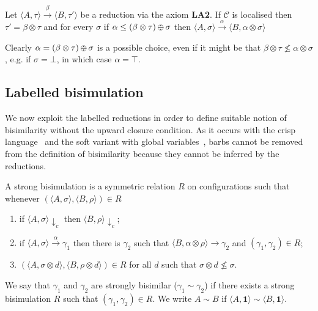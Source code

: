 \documentclass{llncs}
\def\C{{\mathcal C}}
\def\monid{{\mathbf 0}}
\def\C{{\mathcal C}}
\def\odiv{\, {\ominus\hspace{-7.7pt} \div} \,}
\def\monid{\mathbf{1}}
\begin{document}
\begin{lemma}
\label{LA2}
Let $\langle A, \tau \rangle \xrightarrow{\beta} \langle B, \tau' \rangle$ be a reduction 
via the axiom {\bf LA2}. If $\C$ is localised then $\tau' = \beta \otimes \tau$
and for every $\sigma$ if $\alpha \leq (\beta \otimes \tau) \odiv \sigma$ then
$\langle A, \sigma \rangle \xrightarrow{\alpha} \langle B, \alpha \otimes \sigma \rangle$
\end{lemma}


Clearly $\alpha = (\beta \otimes \tau) \odiv \sigma$ is a possible choice, even if 
it might be that $\beta \otimes \tau \not \leq \alpha \otimes \sigma$,
e.g. if $\sigma = \bot$, in which case $\alpha = \top$.


%




\subsection{Labelled bisimulation}\label{sec:bisimilarity}
We now exploit the labelled reductions in order to define suitable notion of bisimilarity without the upward closure condition.
As it occurs with the crisp language~\cite{pippo} and the soft variant with global variables~\cite{festcatuscia}, 
barbs cannot be removed from the 
definition of bisimilarity because they cannot be inferred by the reductions.

\begin{definition}\label{def:strongbis} A strong bisimulation is a symmetric relation $R$ on configurations such that whenever
$( \langle A, \sigma \rangle,\langle B, \rho \rangle) \in R$
\begin{enumerate}
\item if $\langle A, \sigma \rangle \downarrow_c$ then $\langle B, \rho \rangle \downarrow_c$;
\item if $\langle A, \sigma \rangle \xrightarrow{\alpha} \gamma_1$ then there is $\gamma_2$ such that $\langle B, \alpha \otimes \rho \rangle \to \gamma_2$ 
and $(\gamma_1, \gamma_2) \in R$;
\item $(\langle A,\sigma \otimes d\rangle, \langle B,\rho \otimes d \rangle) \in R$ for  all $d$ such that $\sigma \otimes d \not \leq \sigma$. 
\end{enumerate}
We say that $\gamma_1$ and $\gamma_2$ are  strongly bisimilar ($\gamma_1  \sim \gamma_2$) if there exists a strong  bisimulation 
$R$ such that $(\gamma_1 , \gamma_2 ) \in R$. We write $A \sim B$ if $\langle A, \monid \rangle \sim \langle B, \monid \rangle$.
\end{definition}
\end{document}
